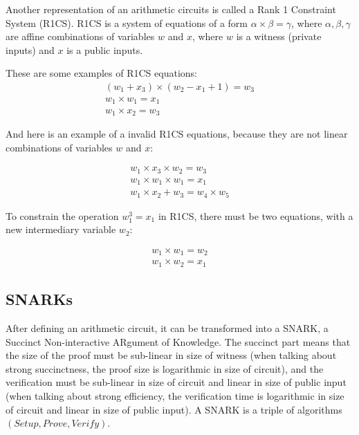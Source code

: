 \documentclass[conference,comsoc,10pt]{IEEEtran}
\begin{document}
        Another representation of an arithmetic circuits is called a Rank 1 Constraint
        System (R1CS). R1CS is a system of equations of a form $\alpha \times \beta = \gamma$,
        where $\alpha, \beta, \gamma$ are affine combinations of variables $w$ and $x$,
        where $w$ is a witness (private inputs) and $x$ is a public inputs.

        These are some examples of R1CS equations:
        \begin{displaymath}
            \begin{array}{l}
                (w_1 + x_3) \times (w_2 - x_1 + 1) = w_3 \\
                w_1 \times w_1 = x_1                     \\
                w_1 \times x_2 = w_3
            \end{array}
        \end{displaymath}

        And here is an example of a invalid R1CS equations, because they are not linear
        combinations of variables $w$ and $x$:

        \begin{displaymath}
            \begin{array}{l}
                w_1 \times x_3 \times w_2 = w_3 \\
                w_1 \times w_1 \times w_1 = x_1 \\
                w_1 \times x_2 + w_3 = w_4 \times w_5
            \end{array}
        \end{displaymath}

        To constrain the operation $w_1^3 = x_1$ in R1CS, there must be two equations, with
        a new intermediary variable $w_2$:

        \begin{displaymath}
            \begin{array}{l}
                w_1 \times w_1 = w_2 \\
                w_1 \times w_2 = x_1
            \end{array}
        \end{displaymath}

    \subsection{SNARKs}

        After defining an arithmetic circuit, it can be transformed into a SNARK,
        a Succinct Non-interactive ARgument of Knowledge. The succinct part means that
        the size of the proof must be sub-linear in size of witness (when talking about
        strong succinctness, the proof size is logarithmic in size of circuit), and
        the verification must be sub-linear in size of circuit and linear in size of
        public input (when talking about strong efficiency, the verification time is
        logarithmic in size of circuit and linear in size of public input).
        A SNARK is a triple of algorithms $(Setup, Prove, Verify)$\cite{Groth16}.
\end{document}
